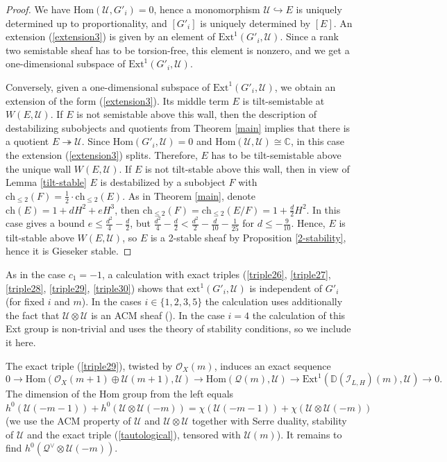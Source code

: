 \documentclass{amsart}
\begin{document}
\begin{proof}We have $\mathrm{Hom}(\mathcal U,G'_i)=0$, hence a monomorphism $\mathcal U\hookrightarrow E$ is uniquely determined up to proportionality, and $[G'_i]$ is uniquely determined by $[E]$. An extension (\ref{extension3}) is given by an element of $\mathrm{Ext}^1(G'_i,\mathcal U)$. Since a rank two semistable sheaf has to be torsion-free, this element is nonzero, and we get a one-dimensional subspace of $\mathrm{Ext}^1(G'_i,\mathcal U)$.

Conversely, given a one-dimensional subspace of $\mathrm{Ext}^1(G'_i,\mathcal U)$, we obtain an extension of the form (\ref{extension3}). Its middle term $E$ is tilt-semistable at $W(E,\mathcal U)$. If $E$ is not semistable above this wall, then the description of destabilizing subobjects and quotients from Theorem \ref{main} implies that there is a quotient $E\twoheadrightarrow\mathcal U$. Since $\mathrm{Hom}(G'_i,\mathcal U)=0$ and $\mathrm{Hom}(\mathcal U,\mathcal U)\cong\mathbb C$, in this case the extension (\ref{extension3}) splits. Therefore, $E$ has to be tilt-semistable above the unique wall $W(E,\mathcal U)$. If $E$ is not tilt-stable above this wall, then in view of Lemma \ref{tilt-stable} $E$ is destabilized by a subobject $F$ with $\mathrm{ch}_{\le 2}(F)=\frac 12\cdot\mathrm{ch}_{\le 2}(E)$. As in Theorem \ref{main}, denote $\mathrm{ch}(E)=1+dH^2+eH^3$, then $\mathrm{ch}_{\le 2}(F)=\mathrm{ch}_{\le 2}(E/F)=1+\frac d2H^2$. In this case \cite[Lemma 4.2]{Vass} gives a bound $e\le\frac{d^2}{4}-\frac d2$, but $\frac{d^2}{4}-\frac d2<\frac{d^2}{2}-\frac{d}{10}-\frac{1}{25}$ for $d\le-\frac{9}{10}$.  
Hence, $E$ is tilt-stable above $W(E,\mathcal U)$, so $E$ is a 2-stable sheaf by Proposition \ref{2-stability}, hence it is Gieseker stable.
\end{proof}

As in the case $c_1=-1$, a calculation with exact triples (\ref{triple26}, \ref{triple27}, \ref{triple28}, \ref{triple29}, \ref{triple30}) shows that $\mathrm{ext}^1(G'_i,\mathcal U)$ is independent of $G'_i$ (for fixed $i$ and $m$). In the cases $i\in\{1, 2, 3, 5\}$ the calculation uses additionally the fact that $\mathcal U\otimes\mathcal U$ is an ACM sheaf (\cite[proof of Proposition 5.6]{Faenzi}). In the case $i=4$ the calculation of this Ext group is non-trivial and uses the theory of stability conditions, so we include it here.

The exact triple (\ref{triple29}), twisted by $\mathcal O_X(m)$, induces an exact sequence
\begin{equation}\label{ext}0\to\mathrm{Hom}(\mathcal O_X(m+1)\oplus\mathcal U(m+1),\mathcal U)\to\mathrm{Hom}(\mathcal Q(m),\mathcal U)\to\mathrm{Ext}^1(\mathbb D(\mathcal I_{L,H})(m),\mathcal U)\to 0.\end{equation}
The dimension of the Hom group from the left equals $h^0(\mathcal U(-m-1))+h^0(\mathcal U\otimes\mathcal U(-m))=\chi(\mathcal U(-m-1))+\chi(\mathcal U\otimes\mathcal U(-m))$ (we use the ACM property of $\mathcal U$ and $\mathcal U\otimes\mathcal U$ together with Serre duality, stability of $\mathcal U$ and the exact triple (\ref{tautological}), tensored with $\mathcal U(m)$). It remains to find $h^0(\mathcal Q^\vee\otimes\mathcal U(-m))$.
\end{document}
